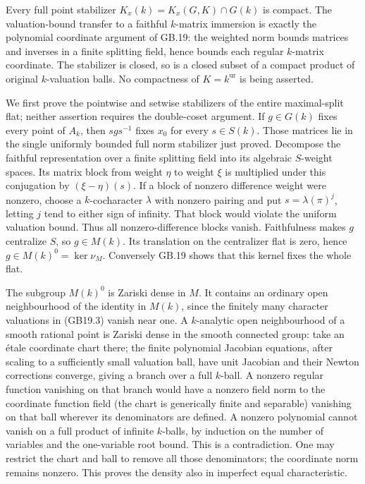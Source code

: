 \documentclass[
  11pt,
]{article}
\begin{document}
Every full point stabilizer \(K_x(k)=K_x(G,K)\cap G(k)\) is compact. The
valuation-bound transfer to a faithful \(k\)-matrix immersion is exactly
the polynomial coordinate argument of GB.19: the weighted norm bounds
matrices and inverses in a finite splitting field, hence bounds each
regular \(k\)-matrix coordinate. The stabilizer is closed, so is a
closed subset of a compact product of original \(k\)-valuation balls. No
compactness of \(K=k^{\mathrm{ur}}\) is being asserted.

We first prove the pointwise and setwise stabilizers of the entire
maximal-split flat; neither assertion requires the double-coset
argument. If \(g\in G(k)\) fixes every point of \(A_k\), then
\(sgs^{-1}\) fixes \(x_0\) for every \(s\in S(k)\). Those matrices lie
in the single uniformly bounded full norm stabilizer just proved.
Decompose the faithful representation over a finite splitting field into
its algebraic \(S\)-weight spaces. Its matrix block from weight \(\eta\)
to weight \(\xi\) is multiplied under this conjugation by
\((\xi-\eta)(s)\). If a block of nonzero difference weight were nonzero,
choose a \(k\)-cocharacter \(\lambda\) with nonzero pairing and put
\(s=\lambda(\pi)^j\), letting \(j\) tend to either sign of infinity.
That block would violate the uniform valuation bound. Thus all
nonzero-difference blocks vanish. Faithfulness makes \(g\) centralize
\(S\), so \(g\in M(k)\). Its translation on the centralizer flat is
zero, hence \(g\in M(k)^0=\ker\nu_M\). Conversely GB.19 shows that this
kernel fixes the whole flat.

The subgroup \(M(k)^0\) is Zariski dense in \(M\). It contains an
ordinary open neighbourhood of the identity in \(M(k)\), since the
finitely many character valuations in (GB19.3) vanish near one. A
\(k\)-analytic open neighbourhood of a smooth rational point is Zariski
dense in the smooth connected group: take an étale coordinate chart
there; the finite polynomial Jacobian equations, after scaling to a
sufficiently small valuation ball, have unit Jacobian and their Newton
corrections converge, giving a branch over a full \(k\)-ball. A nonzero
regular function vanishing on that branch would have a nonzero field
norm to the coordinate function field (the chart is generically finite
and separable) vanishing on that ball wherever its denominators are
defined. A nonzero polynomial cannot vanish on a full product of
infinite \(k\)-balls, by induction on the number of variables and the
one-variable root bound. This is a contradiction. One may restrict the
chart and ball to remove all those denominators; the coordinate norm
remains nonzero. This proves the density also in imperfect equal
characteristic.
\end{document}
